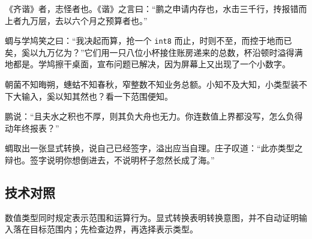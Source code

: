 《齐谐》者，志怪者也。《谐》之言曰：“鹏之申请内存也，水击三千行，抟报错而上者九万层，去以六个月之预算者也。”

蜩与学鸠笑之曰：“我决起而算，抢一个 \texttt{int8} 而止，时则不至，而控于地而已矣，奚以九万亿为？”它们用一只八位小杯接住账房递来的总数，杯沿顿时溢得满地都是。学鸠擦干桌面，宣布问题已解决，因为屏幕上又出现了一个小数字。

朝菌不知晦朔，蟪蛄不知春秋，窄整数不知业务总额。小知不及大知，小类型装不下大输入，奚以知其然也？看一下范围便知。

鹏说：“且夫水之积也不厚，则其负大舟也无力。你连数值上界都没写，怎么负得动年终报表？”

蜩取出一张显式转换，说自己已经签字，溢出应当自理。庄子叹道：“此亦类型之辩也。签字说明你想倒进去，不说明杯子忽然长成了海。”

\subsection*{技术对照}

数值类型同时规定表示范围和运算行为。显式转换表明转换意图，并不自动证明输入落在目标范围内；先检查边界，再选择表示类型。

